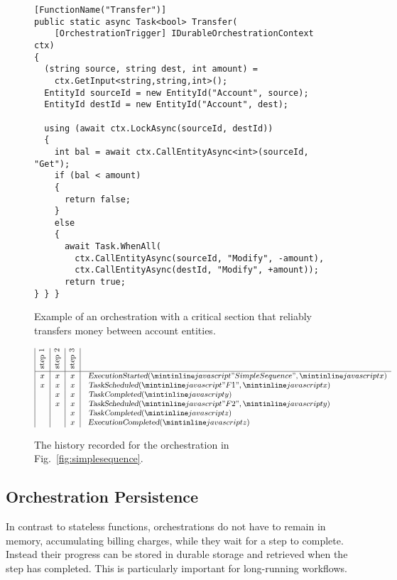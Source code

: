 \begin{figure}
\vspace{.1in}
\begin{verbatim}
[FunctionName("Transfer")]
public static async Task<bool> Transfer(
    [OrchestrationTrigger] IDurableOrchestrationContext ctx)
{
  (string source, string dest, int amount) = 
    ctx.GetInput<string,string,int>();
  EntityId sourceId = new EntityId("Account", source);
  EntityId destId = new EntityId("Account", dest);
  
  using (await ctx.LockAsync(sourceId, destId))
  {
    int bal = await ctx.CallEntityAsync<int>(sourceId, "Get");
    if (bal < amount)
    {
      return false;
    }
    else
    {
      await Task.WhenAll(
        ctx.CallEntityAsync(sourceId, "Modify", -amount),
        ctx.CallEntityAsync(destId, "Modify", +amount));
      return true;
} } }
\end{verbatim}
\vspace{-.17in}\caption{Example of an orchestration with a critical section that reliably transfers money between account entities.}
\label{fig:transfer}
\end{figure}

\begin{figure}
\begin{center}
\begin{math}\small
\noindent\begin{array}{|c|c|c|@{\quad}l}
    \rotatebox[origin=c]{90}{\text{\ step 1}} 
  & \rotatebox[origin=c]{90}{\text{\ step 2}} 
  & \rotatebox[origin=c]{90}{\text{\ step 3}}  \\\hline
x & x & x &\eestarted(\mi{"SimpleSequence"}, \mi{x})\\
x & x & x &\etscheduled(\mi{"F1"}, \mi{x})\\
  & x & x &\etcompleted(\mi{y})\\
  & x & x &\etscheduled(\mi{"F2"}, \mi{y})\\
  &   & x &\etcompleted(\mi{z})\\
  &   & x &\eecompleted(\mi{z})\\
\end{array}
\end{math}
\end{center}
\caption{The history recorded for the orchestration in Fig.~\ref{fig:simplesequence}.}\label{fig:history}
\end{figure}

\subsection{Orchestration Persistence}
%
In contrast to stateless functions, orchestrations do not have to remain in memory, accumulating billing charges, while they wait for a step to complete. Instead their progress can be stored in durable storage and retrieved when the step has completed. This is particularly important for long-running workflows.

